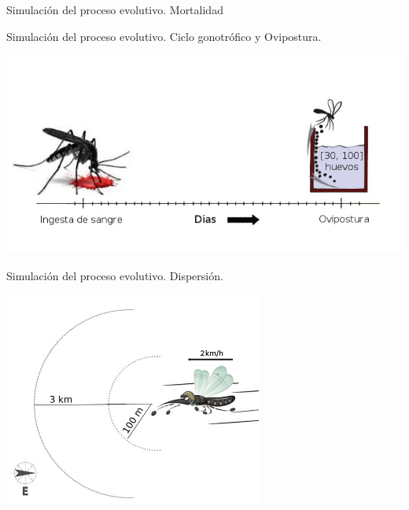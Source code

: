 \begin{frame}[c]{Simulación del proceso evolutivo. Mortalidad}

\end{frame}


\begin{frame}[c]{Simulación del proceso evolutivo. Ciclo gonotrófico y Ovipostura.}
  \begin{center}
      \includegraphics[width=\textwidth]{./graphics/cliclo-gonotrofico-tiempo.jpg}
  \end{center}
\end{frame}

\begin{frame}[c]{Simulación del proceso evolutivo. Dispersión.}
  \begin{center}
    \includegraphics[width=8.5cm]{./graphics/dispersion.jpg}
  \end{center}
\end{frame}


